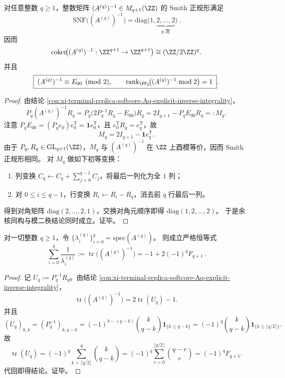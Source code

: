 \begin{conclusion}\label{con:xi-terminal-replica-softcore-Aq-inverse-smith-mod2-collapse}
对任意整数 \(q\ge 1\)，整数矩阵 \((A^{(q)})^{-1}\in M_{q+1}(\ZZ)\) 的 Smith 正规形满足
\[
\boxed{\;
\mathrm{SNF}\bigl((A^{(q)})^{-1}\bigr)
=\mathrm{diag}\bigl(1,\underbrace{2,\dots,2}_{q\text{ 次}}\bigr)\; }.
\]
因而
\[
\mathrm{coker}\!\bigl((A^{(q)})^{-1}:\ZZ^{q+1}\to\ZZ^{q+1}\bigr)
\cong (\ZZ/2\ZZ)^q.
\]
并且
\[
\boxed{\;
(A^{(q)})^{-1}\equiv E_{00}\pmod 2,\qquad
\mathrm{rank}_{\FF_2}\!\bigl((A^{(q)})^{-1}\bmod 2\bigr)=1\; }.
\]
\end{conclusion}
\begin{proof}
由结论 \ref{con:xi-terminal-replica-softcore-Aq-explicit-inverse-integrality}，
\[
P_q(A^{(q)})^{-1}R_q
=P_q\bigl(2P_q^{-1}R_q-E_{00}\bigr)R_q
=2I_{q+1}-P_qE_{00}R_q
=:M_q.
\]
注意 \(P_qE_{00}=(P_qe_0)e_0^{\mathsf T}=\mathbf 1e_0^{\mathsf T}\)，且 \(e_0^{\mathsf T}R_q=e_q^{\mathsf T}\)，故
\[
M_q=2I_{q+1}-\mathbf 1e_q^{\mathsf T}.
\]
由于 \(P_q,R_q\in\mathrm{GL}_{q+1}(\ZZ)\)，\(M_q\) 与 \((A^{(q)})^{-1}\) 在 \(\ZZ\) 上酉模等价，因而 Smith 正规形相同。
对 \(M_q\) 做如下初等变换：
\begin{enumerate}
  \item 列变换 \(C_q\leftarrow C_q+\sum_{j=0}^{q-1}C_j\)，将最后一列化为全 \(1\) 列；
  \item 对 \(0\le i\le q-1\)，行变换 \(R_i\leftarrow R_i-R_q\)，消去前 \(q\) 行最后一列。
\end{enumerate}
得到对角矩阵 \(\mathrm{diag}(2,\dots,2,1)\)，交换对角元顺序即得
\(\mathrm{diag}(1,2,\dots,2)\)。
于是余核同构与模二秩结论同时成立。证毕。
\end{proof}

\begin{corollary}\label{cor:xi-terminal-replica-softcore-exceptional-reciprocal-sum-fibonacci}
对一切整数 \(q\ge 1\)，令 \(\{\lambda_i^{(q)}\}_{i=0}^{q}=\mathrm{spec}(A^{(q)})\)。
则成立严格恒等式
\[
\boxed{\ \sum_{i=0}^{q}\frac{1}{\lambda_i^{(q)}}
:=\operatorname{tr}\bigl((A^{(q)})^{-1}\bigr)
=-1+2(-1)^qF_{q+1}\ } .
\]
\end{corollary}
\begin{proof}
记 \(U_q:=P_q^{-1}R_q\)。由结论 \ref{con:xi-terminal-replica-softcore-Aq-explicit-inverse-integrality}，
\[
\operatorname{tr}\bigl((A^{(q)})^{-1}\bigr)=2\operatorname{tr}(U_q)-1.
\]
并且
\[
(U_q)_{k,k}
=(P_q^{-1})_{k,q-k}
=(-1)^{k-(q-k)}\binom{k}{q-k}\mathbf 1_{\{k\ge q-k\}}
=(-1)^q\binom{k}{q-k}\mathbf 1_{\{k\ge \lceil q/2\rceil\}}.
\]
故
\[
\operatorname{tr}(U_q)
=(-1)^q\sum_{k=\lceil q/2\rceil}^{q}\binom{k}{q-k}
=(-1)^q\sum_{r=0}^{\lfloor q/2\rfloor}\binom{q-r}{r}
=(-1)^qF_{q+1}.
\]
代回即得结论。证毕。
\end{proof}

